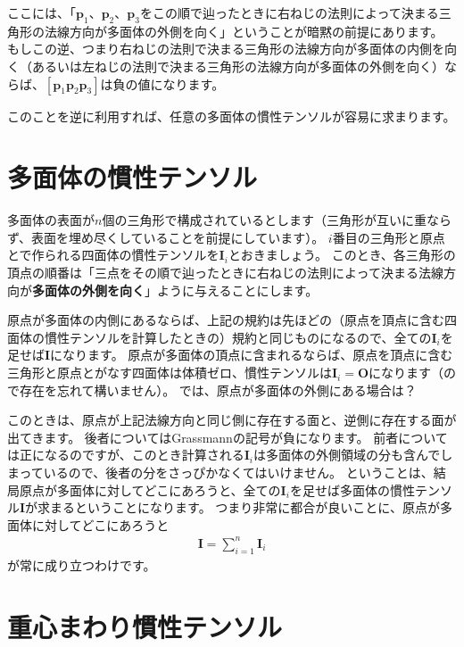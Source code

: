 \documentclass{jsarticle}
\begin{document}
ここには、「$\boldsymbol{p}_{1}$、$\boldsymbol{p}_{2}$、$\boldsymbol{p}_{3}$をこの順で辿ったときに右ねじの法則によって決まる三角形の法線方向が多面体の外側を向く」ということが暗黙の前提にあります。
もしこの逆、つまり右ねじの法則で決まる三角形の法線方向が多面体の内側を向く（あるいは左ねじの法則で決まる三角形の法線方向が多面体の外側を向く）ならば、$[\boldsymbol{p}_{1} \boldsymbol{p}_{2} \boldsymbol{p}_{3}]$は負の値になります。

このことを逆に利用すれば、任意の多面体の慣性テンソルが容易に求まります。

\section{多面体の慣性テンソル}

多面体の表面が$n$個の三角形で構成されているとします（三角形が互いに重ならず、表面を埋め尽くしていることを前提にしています）。
$i$番目の三角形と原点とで作られる四面体の慣性テンソルを$\boldsymbol{I}_{i}$とおきましょう。
このとき、各三角形の頂点の順番は「三点をその順で辿ったときに右ねじの法則によって決まる法線方向が{\bf 多面体の外側を向く}」ように与えることにします。

原点が多面体の内側にあるならば、上記の規約は先ほどの（原点を頂点に含む四面体の慣性テンソルを計算したときの）規約と同じものになるので、全ての$\boldsymbol{I}_{i}$を足せば$\boldsymbol{I}$になります。
原点が多面体の頂点に含まれるならば、原点を頂点に含む三角形と原点とがなす四面体は体積ゼロ、慣性テンソルは$\boldsymbol{I}_{i}=\boldsymbol{O}$になります（ので存在を忘れて構いません）。
では、原点が多面体の外側にある場合は？

このときは、原点が上記法線方向と同じ側に存在する面と、逆側に存在する面が出てきます。
後者についてはGrassmannの記号が負になります。
前者については正になるのですが、このとき計算される$\boldsymbol{I}_{i}$は多面体の外側領域の分も含んでしまっているので、後者の分をさっぴかなくてはいけません。
ということは、結局原点が多面体に対してどこにあろうと、全ての$\boldsymbol{I}_{i}$を足せば多面体の慣性テンソル$\boldsymbol{I}$が求まるということになります。
つまり非常に都合が良いことに、原点が多面体に対してどこにあろうと
\begin{align*}
\boldsymbol{I}=\sum_{i=1}^{n}\boldsymbol{I}_{i}
\end{align*}
が常に成り立つわけです。

\section{重心まわり慣性テンソル}
\end{document}
